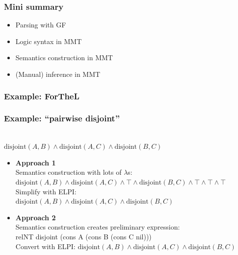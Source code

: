 \documentclass[aspectratio=169]{beamer}
\begin{document}
\begin{frame}
    \frametitle{Mini summary}
    \begin{itemize}
        \item Parsing with GF
        \item Logic syntax in MMT
        \item Semantics construction in MMT
        \item (Manual) inference in MMT
    \end{itemize}
\end{frame}




\begin{frame}
    \frametitle{Example: ForTheL}
\end{frame}

\begin{frame}
    \frametitle{Example: ``pairwise disjoint''}
    \newcommand\ds{\text{disjoint}}
    \\
    {\color{logicfont} $\ds(A,B) \wedge \ds(A,C) \wedge \ds(B,C)$}
    \vspace{1em}

    \begin{itemize}
        \item \textbf{Approach 1}\\Semantics construction with lots of $\lambda$s:
            {\hspace{2em}\color{logicfont} $\ds(A,B) \wedge \ds(A,C) \wedge \top \wedge \ds(B,C) \wedge \top \wedge \top\wedge\top$}\\
                Simplify with ELPI:\\
            {\hspace{2em}\color{logicfont} $\ds(A,B) \wedge \ds(A,C) \wedge \ds(B,C)$}
        \pause
        \item \textbf{Approach 2}\\Semantics construction creates preliminary expression:\\
            {\hspace{2em}\color{logicfont}\ttfamily relNT disjoint (cons A (cons B (cons C nil))) }\\
                Convert with ELPI:
            {\hspace{2em}\color{logicfont} $\ds(A,B) \wedge \ds(A,C) \wedge \ds(B,C)$}
    \end{itemize}
\end{frame}
\end{document}
